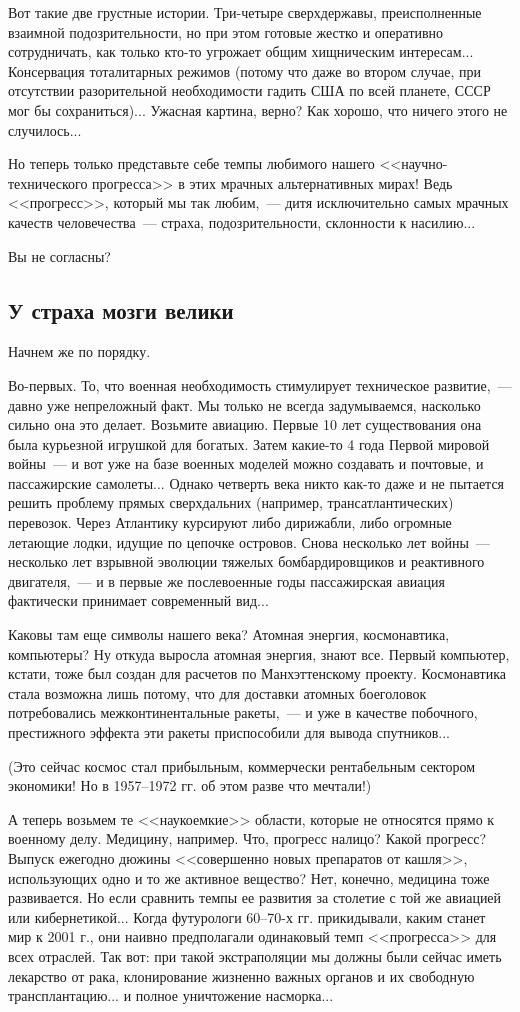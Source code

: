 \documentclass{scrbook}
\newcommand{\flqq}{<<}
\newcommand{\frqq}{>>}
\newcommand{\mdash}{~--- }
\newcommand{\ndash}{--}
\newcommand{\commamdash}{~--- } %
\newcommand{\essaysection}[1]{\subsection*{#1}\nopagebreak}
\begin{document}
Вот такие две грустные истории. Три-четыре сверхдержавы, преисполненные взаимной подозрительности, но при этом готовые жестко и оперативно сотрудничать, как только кто-то угрожает общим хищническим интересам... Консервация тоталитарных режимов (потому что даже во втором случае, при отсутствии разорительной необходимости гадить США по всей планете, СССР мог бы сохраниться)... Ужасная картина, верно? Как хорошо, что ничего этого не случилось...

Но теперь только представьте себе темпы любимого нашего {\flqq}научно-технического прогресса{\frqq} в этих мрачных альтернативных мирах! Ведь {\flqq}прогресс{\frqq}, который мы так любим,{\commamdash}дитя исключительно самых мрачных качеств человечества{\mdash}страха, подозрительности, склонности к насилию...

Вы не согласны?

\essaysection{У страха мозги велики}

Начнем же по порядку.

Во-первых. То, что военная необходимость стимулирует техническое развитие,{\commamdash}давно уже непреложный факт. Мы только не всегда задумываемся, насколько сильно она это делает. Возьмите авиацию. Первые 10 лет существования она была курьезной игрушкой для богатых. Затем какие-то 4 года Первой мировой войны{\mdash}и вот уже на базе военных моделей можно создавать и почтовые, и пассажирские самолеты... Однако четверть века никто как-то даже и не пытается решить проблему прямых сверхдальних (например, трансатлантических) перевозок. Через Атлантику курсируют либо дирижабли, либо огромные летающие лодки, идущие по цепочке островов. Снова несколько лет войны{\mdash}несколько лет взрывной эволюции тяжелых бомбардировщиков и реактивного двигателя,{\commamdash}и в первые же послевоенные годы пассажирская авиация фактически принимает современный вид...

Каковы там еще символы нашего века? Атомная энергия, космонавтика, компьютеры? Ну откуда выросла атомная энергия, знают все. Первый компьютер, кстати, тоже был создан для расчетов по Манхэттенскому проекту. Космонавтика стала возможна лишь потому, что для доставки атомных боеголовок потребовались межконтинентальные ракеты,{\commamdash}и уже в качестве побочного, престижного эффекта эти ракеты приспособили для вывода спутников...

(Это сейчас космос стал прибыльным, коммерчески рентабельным сектором экономики! Но в 1957{\ndash}1972 гг. об этом разве что мечтали!)

А теперь возьмем те {\flqq}наукоемкие{\frqq} области, которые не относятся прямо к военному делу. Медицину, например. Что, прогресс налицо? Какой прогресс? Выпуск ежегодно дюжины {\flqq}совершенно новых препаратов от кашля{\frqq}, использующих одно и то же активное вещество? Нет, конечно, медицина тоже развивается. Но если сравнить темпы ее развития за столетие с той же авиацией или кибернетикой... Когда футурологи 60{\ndash}70-х гг. прикидывали, каким станет мир к 2001 г., они наивно предполагали одинаковый темп {\flqq}прогресса{\frqq} для всех отраслей. Так вот: при такой экстраполяции мы должны были сейчас иметь лекарство от рака, клонирование жизненно важных органов и их свободную трансплантацию... и полное уничтожение насморка...
\end{document}
